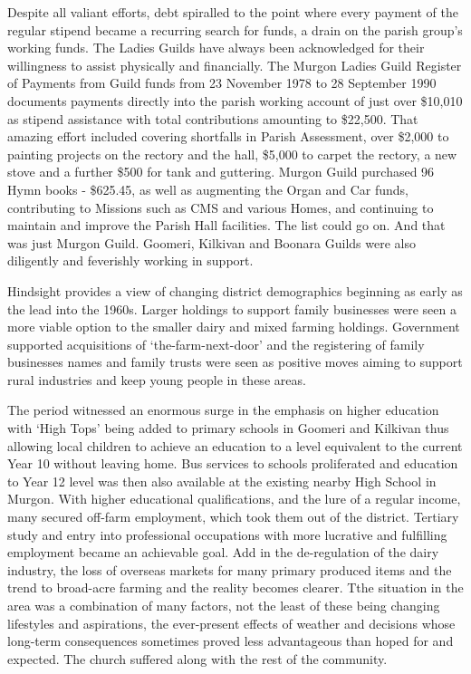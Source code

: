 Despite all valiant efforts, debt spiralled to the point where every payment of the regular stipend became a recurring search for funds, a drain on the parish group's working funds. The Ladies Guilds have always been acknowledged for their willingness to assist physically and financially. The Murgon Ladies Guild Register of Payments from Guild funds from 23 November 1978 to 28 September 1990 documents payments directly into the parish working account of just over \$10,010 as stipend assistance with total contributions amounting to \$22,500. That amazing effort included covering shortfalls in Parish Assessment, over \$2,000 to painting projects on the rectory and the hall, \$5,000 to carpet the rectory, a new stove and a further \$500 for tank and guttering. Murgon Guild purchased 96 Hymn books - \$625.45, as well as augmenting the Organ and Car funds, contributing to Missions such as CMS and various Homes, and continuing to maintain and improve the Parish Hall facilities. The list could go on. And that was just Murgon Guild. Goomeri, Kilkivan and Boonara Guilds were also diligently and feverishly working in support.



Hindsight provides a view of changing district demographics beginning as early as the lead into the 1960s. Larger holdings to support family businesses were seen a more viable option to the smaller dairy and mixed farming holdings. Government supported acquisitions of `the-farm-next-door' and the registering of family businesses names and family trusts were seen as positive moves aiming to support rural industries and keep young people in these areas.



The period witnessed an enormous surge in the emphasis on higher education with `High Tops' being added to primary schools in Goomeri and Kilkivan thus allowing local children to achieve an education to a level equivalent to the current Year 10 without leaving home. Bus services to schools proliferated and education to Year 12 level was then also available at the existing nearby High School in Murgon. With higher educational qualifications, and the lure of a regular income, many secured off-farm employment, which took them out of the district. Tertiary study and entry into professional occupations with more lucrative and fulfilling employment became an achievable goal. Add in the de-regulation of the dairy industry, the loss of overseas markets for many primary produced items and the trend to broad-acre farming and the reality becomes clearer. Tthe situation in the area was a combination of many factors, not the least of these being changing lifestyles and aspirations, the ever-present effects of weather and decisions whose long-term consequences sometimes proved less advantageous than hoped for and expected. The church suffered along with the rest of the community.



